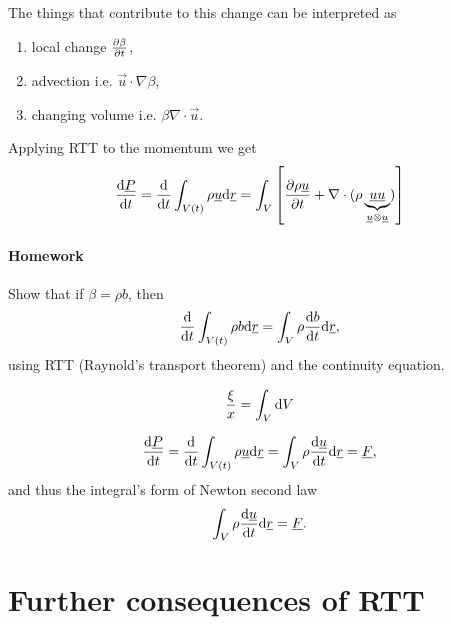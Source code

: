 \documentclass[../main.tex]{subfiles}
\begin{document}
    The things that contribute to this change can be interpreted as
    \begin{enumerate}
      \item local change $\frac{\partial \beta}{\partial t}$,
      \item advection i.e. $\vec u \cdot \nabla \beta$,
      \item changing volume i.e. $\beta \nabla\cdot \vec u$.
    \end{enumerate}

    Applying RTT to the momentum we get
    \begin{displaymath}
      \frac{\mathrm{d} \underline{P} }{\mathrm{d} t} = \frac{\mathrm{d} }{\mathrm{d} t} \int_{V(t)} \rho \underline{u} \mathrm{d} \underline{r} 
      = \int_V \left[ \frac{\partial \rho\underline{u} }{\partial t} + \nabla \cdot (\rho \underbrace{\underline{u} \underline{u}}_{\underline{u} \otimes \underline{u}}) \right]
    \end{displaymath}
    
    \paragraph{Homework} Show that if $\beta = \rho b$, then 
    \begin{displaymath}
      \frac{\mathrm{d} }{\mathrm{d} t} \int_{V(t)} \rho b \mathrm{d} \underline{r} = \int_{V} \rho \frac{\mathrm{d} b}{\mathrm{d} t} \mathrm{d} \underline{r},
    \end{displaymath}
    using RTT (Raynold's transport theorem) and the continuity equation.
    
    \begin{displaymath}
      \frac{\xi }{ x} = \int_V \mathrm{d} V 
    \end{displaymath}
    
    \begin{displaymath}
      \frac{\mathrm{d} \underline{P}}{\mathrm{d} t} = \frac{\mathrm{d} }{\mathrm{d} t} \int_{V(t)} \rho \underline{u} \mathrm{d} \underline{r} 
      = \int_V \rho \frac{\mathrm{d} \underline{u}}{\mathrm{d} t} \mathrm{d} \underline{r} 
      = \underline{F},
    \end{displaymath}
    and thus the integral's form of Newton second law
    \begin{displaymath}
      \int_V \rho \frac{\mathrm{d} \underline{u}}{\mathrm{d} t} \mathrm{d} \underline{r} = \underline{F}.
    \end{displaymath}
    
    \section{Further consequences of RTT}

    \begin{figure}[ht]
      \centering
    \end{figure}
\end{document}
